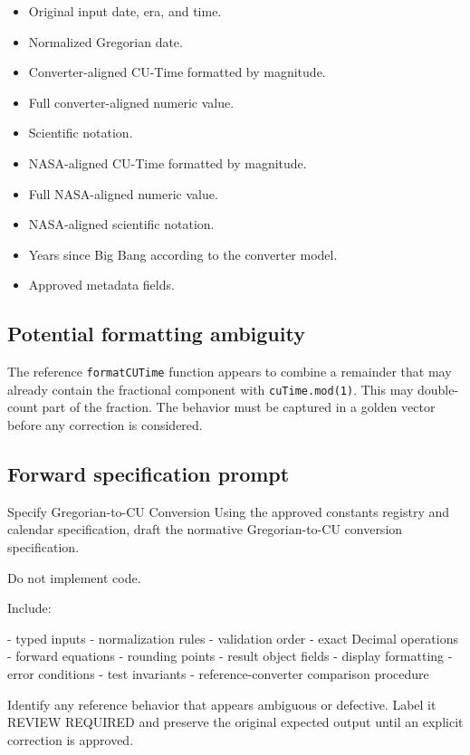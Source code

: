 \documentclass[11pt,letterpaper]{article}
\begin{document}
\begin{itemize}
    \item Original input date, era, and time.
    \item Normalized Gregorian date.
    \item Converter-aligned CU-Time formatted by magnitude.
    \item Full converter-aligned numeric value.
    \item Scientific notation.
    \item NASA-aligned CU-Time formatted by magnitude.
    \item Full NASA-aligned numeric value.
    \item NASA-aligned scientific notation.
    \item Years since Big Bang according to the converter model.
    \item Approved metadata fields.
\end{itemize}

\subsection{Potential formatting ambiguity}

The reference \texttt{formatCUTime} function appears to combine a remainder
that may already contain the fractional component with \texttt{cuTime.mod(1)}.
This may double-count part of the fraction. The behavior must be captured in a
golden vector before any correction is considered.

\subsection{Forward specification prompt}

\begin{promptbox}{Specify Gregorian-to-CU Conversion}
Using the approved constants registry and calendar specification,
draft the normative Gregorian-to-CU conversion specification.

Do not implement code.

Include:

- typed inputs
- normalization rules
- validation order
- exact Decimal operations
- forward equations
- rounding points
- result object fields
- display formatting
- error conditions
- test invariants
- reference-converter comparison procedure

Identify any reference behavior that appears ambiguous or defective.
Label it REVIEW REQUIRED and preserve the original expected output
until an explicit correction is approved.
\end{promptbox}
\end{document}
